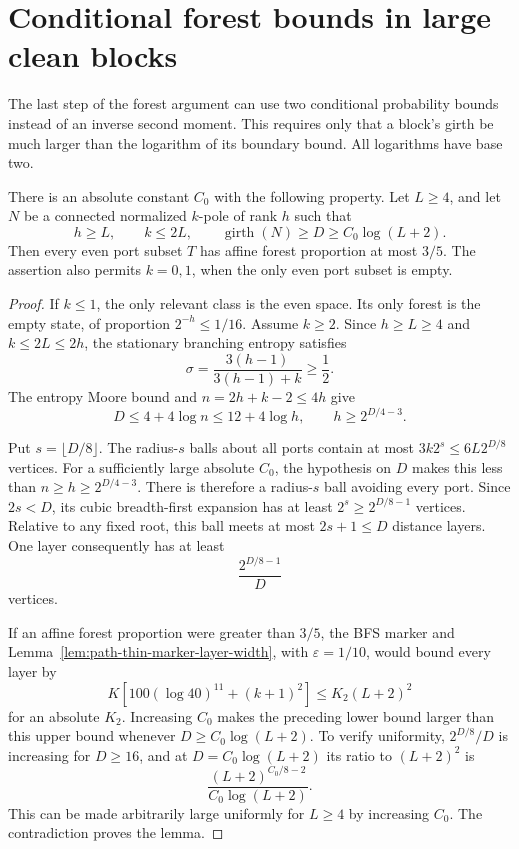 \section{Conditional forest bounds in large clean blocks}
\label{sec:path-high-girth-clean-blocks}

The last step of the forest argument can use two conditional probability bounds instead of an inverse second moment.
This requires only that a block's girth be much larger than the logarithm of its boundary bound.
All logarithms have base two.

\begin{lemma}
\label{lem:path-clean-core-affine-forest}
There is an absolute constant $C_0$ with the following property.
Let $L\ge4$, and let $N$ be a connected normalized $k$-pole of rank $h$ such that
\[
 h\ge L,\qquad k\le2L,
 \qquad\operatorname{girth}(N)\ge D\ge C_0\log(L+2).
\]
Then every even port subset $T$ has affine forest proportion at most $3/5$.
The assertion also permits $k=0,1$, when the only even port subset is empty.
\end{lemma}

\begin{proof}
If $k\le1$, the only relevant class is the even space.
Its only forest is the empty state, of proportion $2^{-h}\le1/16$.
Assume $k\ge2$.
Since $h\ge L\ge4$ and $k\le2L\le2h$, the stationary branching entropy satisfies
\[
 \sigma=\frac{3(h-1)}{3(h-1)+k}\ge\frac12.
\]
The entropy Moore bound and $n=2h+k-2\le4h$ give
\[
 D\le4+4\log n\le12+4\log h,
 \qquad h\ge2^{D/4-3}.
\]

Put $s=\lfloor D/8\rfloor$.
The radius-$s$ balls about all ports contain at most $3k2^s\le6L2^{D/8}$ vertices.
For a sufficiently large absolute $C_0$, the hypothesis on $D$ makes this less than $n\ge h\ge2^{D/4-3}$.
There is therefore a radius-$s$ ball avoiding every port.
Since $2s<D$, its cubic breadth-first expansion has at least $2^s\ge2^{D/8-1}$ vertices.
Relative to any fixed root, this ball meets at most $2s+1\le D$ distance layers.
One layer consequently has at least
\[
 \frac{2^{D/8-1}}D
\]
vertices.

If an affine forest proportion were greater than $3/5$, the BFS marker and Lemma~\ref{lem:path-thin-marker-layer-width}, with $\varepsilon=1/10$, would bound every layer by
\[
 K\left[100(\log40)^{11}+(k+1)^2\right]
 \le K_2(L+2)^2
\]
for an absolute $K_2$.
Increasing $C_0$ makes the preceding lower bound larger than this upper bound whenever $D\ge C_0\log(L+2)$.
To verify uniformity, $2^{D/8}/D$ is increasing for $D\ge16$, and at $D=C_0\log(L+2)$ its ratio to $(L+2)^2$ is
\[
 \frac{(L+2)^{C_0/8-2}}{C_0\log(L+2)}.
\]
This can be made arbitrarily large uniformly for $L\ge4$ by increasing $C_0$.
The contradiction proves the lemma.
\end{proof}

